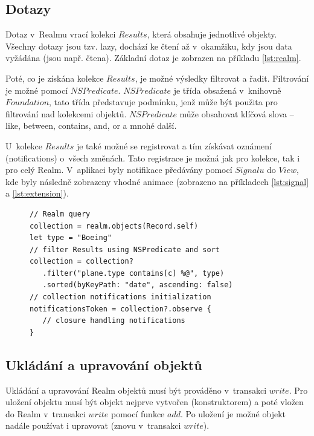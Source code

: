 \documentclass[thesis=M,czech]{FITthesis}[2012/06/26]
\begin{document}
\subsection{Dotazy}
Dotaz v~Realmu vrací kolekci $Results$, která obsahuje jednotlivé objekty. Všechny dotazy jsou tzv. lazy, dochází ke čtení až v~okamžiku, kdy jsou data vyžádána (jsou např. čtena). \cite{realmDocs} Základní dotaz je zobrazen na příkladu \ref{lst:realm}.

Poté, co je získána kolekce $Results$, je možné výsledky filtrovat a řadit. Filtrování je možné pomocí $NSPredicate$. \cite{realmDocs} $NSPredicate$ je třída obsažená v~knihovně $Foundation$, tato třída představuje podmínku, jenž může být použita pro filtrování nad kolekcemi objektů. $NSPredicate$ může obsahovat klíčová slova -- like, between, contains, and, or a mnohé další. \cite{predicate}

U~kolekce $Results$ je také možné se registrovat a tím získávat oznámení (notifications) o~všech změnách. Tato registrace je možná jak pro kolekce, tak i pro celý Realm. \cite{realmDocs} V~aplikaci byly notifikace předávány pomocí $Signalu$ do $View$, kde byly následně zobrazeny vhodné animace (zobrazeno na příkladech \ref{lst:signal} a \ref{lst:extension}).

\begin{figure}
\begin{minipage}{\linewidth}
\begin{lstlisting}[caption={Ukázka dotazu v~Realmu},label={lst:realm}]
// Realm query
collection = realm.objects(Record.self)
let type = "Boeing"
// filter Results using NSPredicate and sort
collection = collection?
   .filter("plane.type contains[c] %@", type)
   .sorted(byKeyPath: "date", ascending: false)
// collection notifications initialization
notificationsToken = collection?.observe {
   // closure handling notifications
}
\end{lstlisting}
\end{minipage}
\end{figure}

\subsection{Ukládání a upravování objektů}
Ukládání a upravování Realm objektů musí být prováděno v~transakci $write$. Pro uložení objektu musí být objekt nejprve vytvořen (konstruktorem) a poté vložen do Realm v~transakci $write$ pomocí funkce $add$. Po uložení je možné objekt nadále používat i upravovat (znovu v~transakci $write$). \cite{realmDocs}
\end{document}
